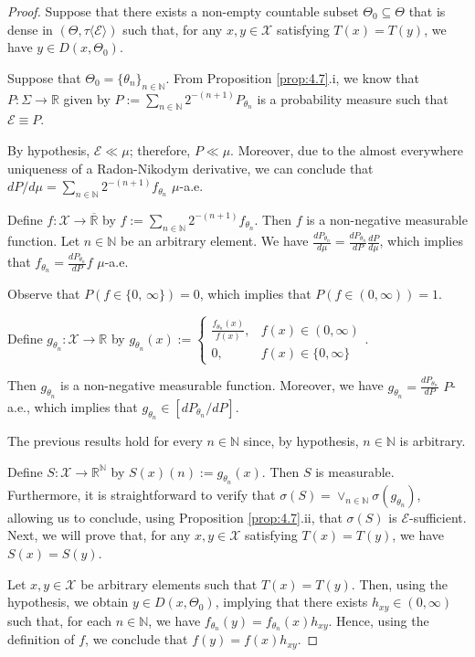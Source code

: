 \documentclass[12pt]{article}
\begin{document}
\begin{proof}
Suppose that there exists a non-empty countable subset $\Theta _0\subseteq\Theta$ that is dense in $(\Theta,\tau \langle \mathcal{E}\rangle )$ such that, for any $x,y\in\mathcal{X}$ satisfying $T(x)=T(y)$, we have $y\in D(x,\Theta _0)$. 

Suppose that $\Theta _0=\{\theta _n\}_{n\in\mathbb{N}}$. From Proposition \ref{prop:4.7}.i, we know that $P:\Sigma\to \mathbb{R}$ given by $P:=\sum _{n\in\mathbb{N}}2^{-(n+1)}P_{\theta _n}$ is a probability measure such that $\mathcal{E}\equiv P$.

By hypothesis, $\mathcal{E}\ll \mu$; therefore, $P\ll \mu$. Moreover, due to the almost everywhere uniqueness of a Radon-Nikodym derivative, we can conclude that $dP/d\mu =\sum _{n\in\mathbb{N} }2^{-(n+1)}f_{\theta _n}$ $\mu$-a.e.

Define $f:\mathcal{X}\to \overline{\mathbb{R}}$ by $f:=\sum _{n\in\mathbb{N}}2^{-(n+1)}f_{\theta _n}$. Then $f$ is a non-negative measurable function. Let $n\in\mathbb{N}$ be an arbitrary element. We have $\frac{dP_{\theta_n}}{d\mu }=\frac{dP_{\theta _n}}{dP}\frac{dP}{d\mu }$, which implies that $f_{\theta _n}=\frac{dP_{\theta _n}}{dP}f$ $\mu$-a.e.

Observe that $P(f\in \{0,\,\infty \})=0$, which implies that $P(f\in (0,\infty ))=1$.

Define $g_{\theta _n}:\mathcal{X}\to\mathbb{R}$ by $g_{\theta _n}(x):=\begin{cases}\frac{f_{\theta _n}(x)}{f(x)},&f(x)\in (0,\infty )\\0,&f(x)\in\{0,\infty \}\end{cases}$.

Then $g_{\theta _n}$ is a non-negative measurable function. Moreover, we have $g_{\theta _n}=\frac{dP_{\theta _n}}{dP}$ $P$-a.e., which implies that $g_{\theta _n}\in [dP_{\theta _n}/dP]$.

The previous results hold for every $n\in\mathbb{N}$ since, by hypothesis, $n\in\mathbb{N}$ is arbitrary.

Define $S:\mathcal{X}\to \mathbb{R}^\mathbb{N}$ by $S(x)(n):=g_{\theta _n}(x)$. Then $S$ is measurable. Furthermore, it is straightforward to verify that $\sigma (S)=\vee _{n\in\mathbb{N}}\sigma (g_{\theta _n})$, allowing us to conclude, using Proposition \ref{prop:4.7}.ii, that $\sigma (S)$ is $\mathcal{E}$-sufficient. Next, we will prove that, for any $x,y\in \mathcal{X}$ satisfying $T(x)=T(y)$, we have $S(x)=S(y)$.

Let $x,y\in\mathcal{X}$ be arbitrary elements such that $T(x)=T(y)$. Then, using the hypothesis, we obtain $y\in D(x,\Theta _0)$, implying that there exists $h_{xy}\in (0,\infty )$ such that, for each $n\in\mathbb{N}$, we have $f_{\theta _n}(y)=f_{\theta_n} (x)h_{xy}$. Hence, using the definition of $f$, we conclude that $f(y)=f(x)h_{xy}$.


\end{proof}
\end{document}
